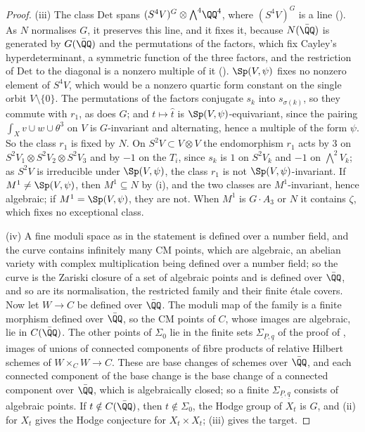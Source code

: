 \begin{proof}
(iii) The class $\mathrm{Det}$ spans $(S^{4}V)^{G}\otimes
{\textstyle\bigwedge^{4}}\QQ^{4}$, where $(S^{4}V)^{G}$ is a line
(). As $N$ normalises $G$, it preserves this line, and it
fixes it, because $N(\bar{\QQ})$ is generated by $G(\bar{\QQ})$ and the
permutations of the factors, which fix Cayley's hyperdeterminant, a
symmetric function of the three factors, and the restriction of
$\mathrm{Det}$ to the diagonal is a nonzero multiple of it
(). $\Sp(V,\psi)$
fixes no nonzero element of $S^{4}V$, which would be a nonzero quartic form
constant on the single orbit $V\setminus\{0\}$. The permutations of the
factors conjugate $s_{k}$ into $s_{\sigma(k)}$, so they commute with $r_{1}$,
as does $G$; and $t\mapsto\hat{t}$ is $\Sp(V,\psi)$-equivariant, since the
pairing $\int_{X}v\cup w\cup\theta^{3}$ on $V$ is $G$-invariant and
alternating, hence a multiple of the form $\psi$. So the class $r_{1}$ is
fixed by $N$. On $S^{2}V\subset V\otimes V$ the endomorphism $r_{1}$ acts by
$3$ on $S^{2}V_{1}\otimes S^{2}V_{2}\otimes S^{2}V_{3}$ and by $-1$ on the
$T_{i}$, since $s_{k}$ is $1$ on $S^{2}V_{k}$ and $-1$ on
${\textstyle\bigwedge^{2}}V_{k}$; as $S^{2}V$ is irreducible under
$\Sp(V,\psi)$, the class $r_{1}$ is not $\Sp(V,\psi)$-invariant. If
$M^{1}\ne\Sp(V,\psi)$, then $M^{1}\subseteq N$ by (i), and the two classes are
$M^{1}$-invariant, hence algebraic; if $M^{1}=\Sp(V,\psi)$, they are not. When
$M^{1}$ is $G\cdot A_{3}$ or $N$ it contains $\zeta$, which fixes no
exceptional class.

(iv) A fine moduli space as in the statement is defined over a number field,
and the curve contains infinitely many CM points, which are algebraic, an
abelian variety with complex multiplication being defined over a number
field; so the curve is the Zariski closure of a set of algebraic points and
is defined over $\bar{\QQ}$, and so are its normalisation, the restricted
family and their finite \'etale covers. Now let $W\to C$ be defined over
$\bar{\QQ}$. The moduli map of the family is a finite morphism defined over
$\bar{\QQ}$, so the CM points of $C$, whose images are algebraic, lie in
$C(\bar{\QQ})$. The other points of $\Sigma_{0}$ lie in the finite sets
$\Sigma_{\underline{P},\underline{q}}$ of the proof of
, images of unions of connected components of fibre
products of relative Hilbert schemes of $W\times_{C}W\to C$. These are base
changes of schemes over $\bar{\QQ}$, and each connected component of the
base change is the base change of a connected component over $\bar{\QQ}$,
which is algebraically closed; so a finite
$\Sigma_{\underline{P},\underline{q}}$ consists of algebraic points. If
$t\notin C(\bar{\QQ})$, then $t\notin\Sigma_{0}$, the Hodge group of $X_{t}$ is
$G$, and (ii) for $X_{t}$ gives the Hodge conjecture for $X_{t}\times X_{t}$;
(iii) gives the target.
\end{proof}

